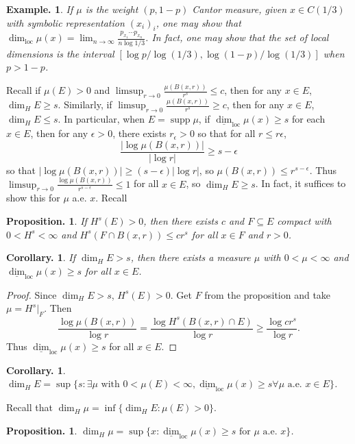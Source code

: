 \documentclass[11pt, a4paper]{memoir}
\theoremstyle{change}
\newtheorem{corollary}[theorem]{Corollary.}
\newtheorem{proposition}[theorem]{Proposition.}
\theoremstyle{plain}
\theoremstyle{nonumberplain}
\newtheorem{example}{Example.}
\newtheorem{proof}{Proof}
\DeclareMathOperator{\supp}{supp}
\DeclareMathOperator{\loc}{loc}
\numberwithin{equation}{section}
\begin{document}
\begin{example}
    If $\mu$ is the weight $(p,1-p)$ Cantor measure, given $x\in C(1/3)$ with symbolic representation $(x_i)_i$, one may show that $\dim_{\loc}\mu(x)=\lim_{n\to\infty}\frac{p_{x_1}\cdots p_{x_n}}{n\log 1/3}$.
    In fact, one may show that the set of local dimensions is the interval $[\log p/\log(1/3),\log(1-p)/\log(1/3)]$ when $p>1-p$.
\end{example}
Recall if $\mu(E)>0$ and $\limsup_{r\to 0}\frac{\mu(B(x,r))}{r^s}\leq c$, then for any $x\in E$, $\dim_H E\geq s$.
Similarly, if $\limsup_{r\to 0}\frac{\mu(B(x,r))}{r^s}\geq c$, then for any $x\in E$, $\dim_HE\leq s$.
In particular, when $E=\supp\mu$, if $\underline{\dim}_{\loc}\mu(x)\geq s$ for each $x\in E$, then for any $\epsilon>0$, there exists $r_\epsilon>0$ so that for all $r\leq r\epsilon$,
\begin{equation*}
    \frac{|\log \mu(B(x,r))|}{|\log r|}\geq s-\epsilon
\end{equation*}
so that $|\log \mu(B(x,r))|\geq(s-\epsilon)|\log r|$, so $\mu(B(x,r))\leq r^{s-\epsilon}$.
Thus $\limsup_{r\to 0}\frac{\log\mu(B(x,r))}{r^{s-\epsilon}}\leq 1$ for all $x\in E$, so $\dim_H E\geq s$.
In fact, it suffices to show this for $\mu$ a.e. $x$.
Recall
\begin{proposition}
    If $H^s(E)>0$, then there exists $c$ and $F\subseteq E$ compact with $0<H^s<\infty$ and $H^s(F\cap B(x,r))\leq cr^s$ for all $x\in F$ and $r>0$.
\end{proposition}
\begin{corollary}
    If $\dim_H E>s$, then there exists a measure $\mu$ with $0<\mu<\infty$ and $\underline{\dim}_{\loc}\mu(x)\geq s$ for all $x\in E$.
\end{corollary}
\begin{proof}
    Since $\dim_H E>s$, $H^s(E)>0$.
    Get $F$ from the proposition and take $\mu=H^s|_F$.
    Then
    \begin{equation*}
        \frac{\log\mu(B(x,r))}{\log r}=\frac{\log H^s(B(x,r)\cap E)}{\log r}\geq\frac{\log cr^s}{\log r}.
    \end{equation*}
    Thus $\underline{\dim}_{\loc}\mu(x)\geq s$ for all $x\in E$.
\end{proof}
\begin{corollary}
    $\dim_H E=\sup\{s:\exists\mu\text{ with }0<\mu(E)<\infty,\underline{\dim}_{\loc}\mu(x)\geq s\forall\mu\text{ a.e. }x\in E\}$.
\end{corollary}
Recall that $\dim_H\mu=\inf\{\dim_HE:\mu(E)>0\}$.
\begin{proposition}
    $\dim_H\mu=\sup\{x:\underline{\dim}_{\loc}\mu(x)\geq s\text{ for }\mu\text{ a.e. }x\}$.
\end{proposition}
\end{document}

